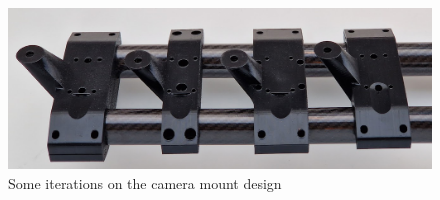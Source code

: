 \begin{figure}[H]
    \centering
    \includegraphics[width=\textwidth]{figures/3d_print/cam_mounts.png}
    \caption{Some iterations on the camera mount design}
    \label{fig:cam_mounts_iterations}
\end{figure}